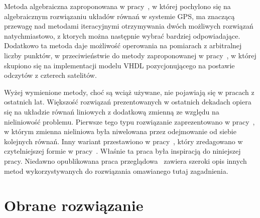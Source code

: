 Metoda algebraiczna zaproponowana w pracy~\cite{4104017}, w której pochylono się na algebraicznym rozwiązaniu układów równań w systemie GPS, ma znaczącą przewagę nad metodami iteracyjnymi otrzymywania dwóch możliwych rozwiązań natychmiastowo, z ktorych można następnie wybrać bardziej odpowiadające. Dodatkowo ta metoda daje możliwość operowania na pomiarach z arbitralnej liczby punktów, w przeciwieństwie do metody zaproponowanej w pracy~\cite{article}, w której skupiono się na implementacji modelu VHDL pozycjonującego na postawie odczytów z czterech satelitów.

Wyżej wymienione metody, choć są wciąż używane, nie pojawiają się w pracach z ostatnich lat. Większość rozwiązań prezentowanych w ostatnich dekadach opiera się na układzie równań liniowych z dodatkową zmienną ze względu na nieliniowość problemu. Pierwsze tego typu rozwiązanie zaprezentowano w pracy~\cite{301830}, w którym zmienna nieliniowa była niwelowana przez odejmowanie od siebie kolejnych równań. Inny wariant przestawiono w pracy~\cite{1018778}, który zredagowano w czytelniejszej formie w pracy~\cite{norrdine2012algebraic}. Właśnie ta praca była inspiracją do niniejszej pracy. Niedawno opublikowana praca przeglądowa~\cite{10419087} zawiera szeroki opis innych metod wykorzystywanych do rozwiązania omawianego tutaj zagadnienia.

\section{Obrane rozwiązanie}

